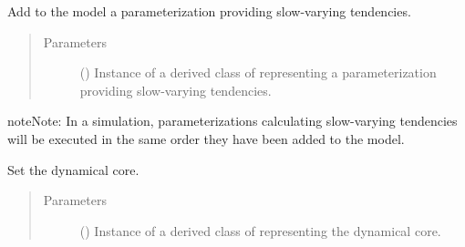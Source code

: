 \documentclass[letterpaper,10pt,english]{sphinxmanual}
\begin{document}
\begin{fulllineitems}
\begin{fulllineitems}
\end{fulllineitems}


\begin{fulllineitems}
\label{\detokenize{api:tasmania.model.Model.add_slow_tendency_parameterization}}
Add to the model a parameterization providing slow-varying tendencies.
\begin{quote}\begin{description}
\item[{Parameters}] \leavevmode
{} () \textendash{} Instance of a derived class of {\hyperref[\detokenize{api:tasmania.parameterizations.slow_tendencies.SlowTendency}]{}}
representing a parameterization providing slow-varying tendencies.

\end{description}\end{quote}

\begin{sphinxadmonition}{note}{Note:}
In a simulation, parameterizations calculating slow-varying tendencies will be executed in the same
order they have been added to the model.
\end{sphinxadmonition}

\end{fulllineitems}


\begin{fulllineitems}
\label{\detokenize{api:tasmania.model.Model.set_dynamical_core}}
Set the dynamical core.
\begin{quote}\begin{description}
\item[{Parameters}] \leavevmode
{} () \textendash{} Instance of a derived class of {\hyperref[\detokenize{api:tasmania.dycore.dycore.DynamicalCore}]{}}
representing the dynamical core.

\end{description}\end{quote}

\end{fulllineitems}


\end{fulllineitems}
\end{document}
